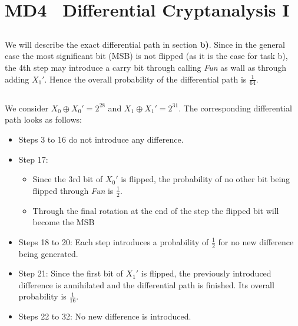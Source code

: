 

\renewcommand\thesubsection{\alph{subsection})}





\section{MD4 \textendash\ Differential Cryptanalysis I}

\subsection{}
We will describe the exact differential path in section \textbf{b)}. Since in the general case the most significant bit (MSB) is not flipped (as it is the case for task b), the 4th step may introduce a carry bit through calling \textit{Fun} as wall as through adding $X_1'$. Hence the overall probability of the differential path is $\frac{1}{64}$.

\subsection{}
We consider $X_0 \oplus X_0' = 2^{28}$ and $X_1 \oplus X_1' = 2^{31}$. The corresponding differential path looks as follows:
\begin{itemize}

\item Steps 3 to 16 do not introduce any difference.
\item Step 17:
\begin {itemize}
  \item Since the 3rd bit of $X_{0}'$ is flipped, the probability of no other bit being flipped through \textit{Fun} is $\frac{1}{2}$.
  \item Through the final rotation at the end of the step the flipped bit will become the MSB
\end{itemize}
\item Steps 18 to 20: Each step introduces a probability of $\frac{1}{2}$ for no new difference being generated.
\item Step 21: Since the first bit of $X_1'$ is flipped, the previously introduced difference is annihilated and the differential path is finished. Its overall probability is $\frac{1}{16}$.
\item Steps 22 to 32: No new difference is introduced.
\end{itemize}

